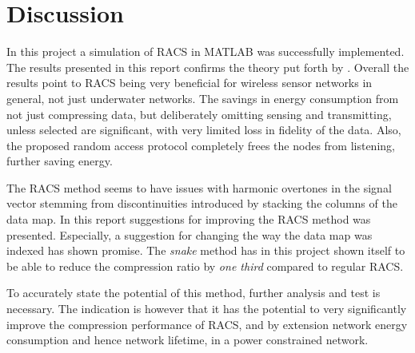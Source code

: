 \documentclass[Main]{subfiles}
\begin{document}
\section{Discussion} %
\label{sec:discussion}

	In this project a simulation of RACS in MATLAB was successfully implemented.
	The results presented in this report confirms the theory put forth by \cite{Fazel2011}.
	Overall the results point to RACS being very beneficial for wireless sensor networks in general, not just underwater networks.
	The savings in energy consumption from not just compressing data, but deliberately omitting sensing and transmitting, unless selected are significant, with very limited loss in fidelity of the data.
	Also, the proposed random access protocol completely frees the nodes from listening, further saving energy.

	The RACS method seems to have issues with harmonic overtones in the signal vector stemming from discontinuities introduced by stacking the columns of the data map.
	In this report suggestions for improving the RACS method was presented.
	Especially, a suggestion for changing the way the data map was indexed has shown promise.
	The \emph{snake} method has in this project shown itself to be able to reduce the compression ratio by \emph{one third} compared to regular RACS.
	
	To accurately state the potential of this method, further analysis and test is necessary.
	The indication is however that it has the potential to very significantly improve the compression performance of RACS, and by extension network energy consumption and hence network lifetime, in a power constrained network.

\end{document}
